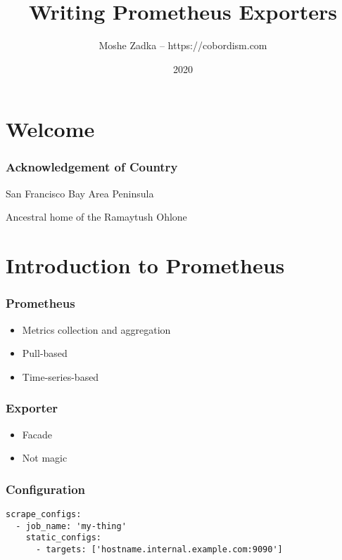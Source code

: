 \usepackage{hyperref}
\usepackage{graphicx}
\usepackage{listings}
\usepackage{textcomp}
\usepackage{fancyvrb}

\title{Writing Prometheus Exporters}
\author{Moshe Zadka -- https://cobordism.com}
\date{2020}


\begin{titlepage}
\maketitle
\end{titlepage}

\section{Welcome}

\frame{\titlepage}

\begin{frame}
\frametitle{Acknowledgement of Country}

San Francisco Bay Area Peninsula

Ancestral home of the Ramaytush Ohlone

\end{frame}

\section{Introduction to Prometheus}

\begin{frame}
\frametitle{Prometheus}

\begin{itemize}
\item Metrics collection and aggregation
\item Pull-based
\item Time-series-based
\end{itemize}

\end{frame}

\begin{frame}
\frametitle{Exporter}

\begin{itemize}
\item Facade
\item Not magic
\end{itemize}

\end{frame}

\begin{frame}
\frametitle{Configuration}

\begin{lstlisting}
scrape_configs:
  - job_name: 'my-thing'
    static_configs:
      - targets: ['hostname.internal.example.com:9090']
\end{lstlisting}

\end{frame}

